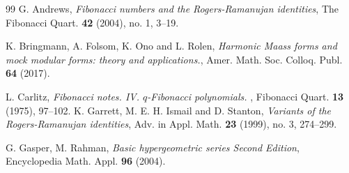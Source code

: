 \documentclass[a4paper]{article}
\numberwithin{equation}{section}
\theoremstyle{plain}
\begin{document}
\begin{thebibliography}{99}
{G. Andrews}, 
{\em Fibonacci numbers and the Rogers-Ramanujan identities}, 
{The Fibonacci Quart. {\bf{42}} (2004), no. 1, 3--19}. 

%
%



{K. Bringmann, A. Folsom, K. Ono and L. Rolen}, 
{\em Harmonic Maass forms and mock modular forms: theory and applications.}, 
{Amer. Math. Soc. Colloq. Publ. {\bf{64}} (2017)}.

{L. Carlitz}, 
{\em Fibonacci notes. I\hspace{-1.2pt}V. $q$-Fibonacci polynomials. },
{Fibonacci Quart. {\bf{13}} (1975), 97--102}. 
{K. Garrett, M. E. H. Ismail and D. Stanton}, 
{\em Variants of the Rogers-Ramanujan identities}, 
{Adv. in Appl. Math. {\bf{23}} (1999), no. 3, 274--299}. 

{G. Gasper, M. Rahman}, 
{\em Basic hypergeometric series Second Edition}, 
{Encyclopedia Math. Appl. {\bf{96}} (2004)}.


\end{thebibliography}
\end{document}
